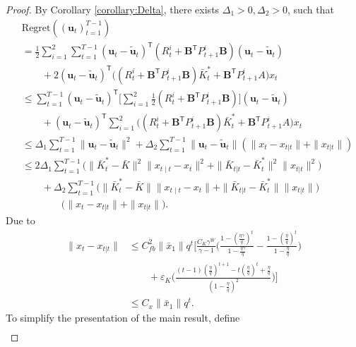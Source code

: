 \documentclass[letterpaper, 10 pt, conference]{ieeeconf}  %
\newcommand{\contTilde}[1]{\mathbf{\tilde{#1}}}
\newcommand{\transpose}{\mathsf{T}}
\begin{document}
\begin{proof}
By Corollary \ref{corollary:Delta}, there exists $\Delta_{1}>0,\Delta_{2}>0$, such that
\begin{align*}
    &\text{Regret}((\mathbf{u}_{t})_{t=1}^{T-1})\\
    &= \frac{1}{2}\sum_{i=1}^{2}\sum_{t=1}^{T-1} (\mathbf{u}_{t}-\contTilde{u}_{t})^{\transpose}(R_{t}^{i}+\mathbf{B}^{\transpose}P_{t+1}^{i}\mathbf{B})(\mathbf{u}_{t}-\contTilde{u}_{t})\\
    &\qquad + 2(\mathbf{u}_{t}-\contTilde{u}_{t})^{\transpose}\bigg((R_{t}^{i}+\mathbf{B}^{\transpose}P_{t+1}^{i}\mathbf{B})\bar{K}_{t}^{*}+\mathbf{B}^{\transpose}P_{t+1}^{i}A\bigg)x_{t}\\
    &\leq \sum_{t=1}^{T-1} (\mathbf{u}_{t}-\contTilde{u}_{t})^{\transpose}\bigg[\sum_{i=1}^{2}\frac{1}{2}(R_{t}^{i}+\mathbf{B}^{\transpose}P_{t+1}^{i}\mathbf{B})\bigg](\mathbf{u}_{t}-\contTilde{u}_{t})\\
    &\qquad + (\mathbf{u}_{t}-\contTilde{u}_{t})^{\transpose}\sum_{i=1}^{2}\bigg( (R_{t}^{i}+\mathbf{B}^{\transpose}P_{t+1}^{i}\mathbf{B})\bar{K}_{t}^{*}+\mathbf{B}^{\transpose}P_{t+1}^{i}A\bigg)x_{t}\\
    &\leq \Delta_{1} \sum_{t=1}^{T-1} \|\mathbf{u}_{t}-\contTilde{u}_{t}\|^2 + \Delta_{2}\sum_{t=1}^{T-1} \|\mathbf{u}_{t}-\contTilde{u}_{t}\|(\|x_{t}-x_{t|t}\| + \|x_{t|t}\|)\\
    &\leq 2\Delta_{1} \sum_{t=1}^{T-1} \bigg(\|\bar{K}_{t}^{*}-\bar{K}\|^{2}\|x_{t\mid t}-x_{t}\|^{2}  + \|\bar{K}_{t|t}-\bar{K}_{t}^{*}\|^{2} \|x_{t|t}\|^{2} \bigg)\\
    &\qquad + \Delta_{2}\sum_{t=1}^{T-1}\bigg( \|\bar{K}_{t}^{*}-\bar{K}\|\|x_{t\mid t}-x_{t}\|  + \|\bar{K}_{t|t}-\bar{K}_{t}^{*}\| \|x_{t|t}\|\bigg)\\
    &\qquad\qquad\bigg(\|x_{t}-x_{t|t}\| + \|x_{t|t}\|\bigg).
\end{align*}
Due to
\begin{align*}
    \|x_{t}-x_{t|t}\|&\leq C_{fb}^{2}\|\bar{x}_{1}\|q^{t}[\frac{C_{K}\gamma^{W}}{\gamma-1}\bigg(\frac{1-(\frac{\eta\gamma}{q})^{t}}{1-\frac{\eta\gamma}{q}} - \frac{1-(\frac{\eta}{q})^{t}}{1-\frac{\eta}{q}} \bigg)\\
    &\qquad+\varepsilon_{K}\bigg(\frac{(t-1)(\frac{\eta}{q})^{t+1}-t(\frac{\eta}{q})^{t}+\frac{\eta}{q}}{(1-\frac{\eta}{q})^{2}}\bigg)]\\
    &\leq C_{x}\|\bar{x}_{1}\|q^{t}.
\end{align*}
To simplify the presentation of the main result, define
\begin{align*}

\end{align*}
\end{proof}
\end{document}
